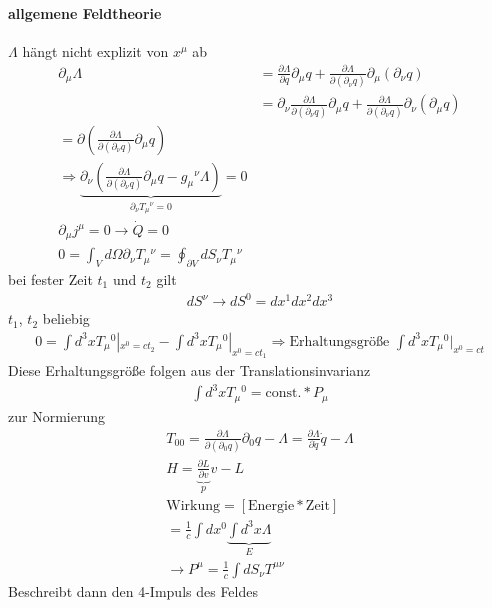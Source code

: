 \documentclass[a4paper]{article}
\begin{document}
\paragraph{allgemene Feldtheorie}
$\Lambda$ hängt nicht explizit von $x^\mu$ ab
\begin{align}
\partial_\mu \Lambda &= \frac{\partial \Lambda}{\partial q}
\partial_\mu\!q+\frac{\partial \Lambda}{\partial(\partial_\nu
q)}\partial_\mu(\partial_\nu q)\\
&=\partial_\nu \frac{\partial \Lambda}{\partial (\partial_\nu q)}
\partial_\mu\!q+\frac{\partial \Lambda}{\partial(\partial_\nu
q)}\partial_\nu(\partial_\mu q)\\
=\partial\left( \frac{\partial \Lambda}{\partial(\partial_\nu q)}\partial_\mu q
\right)\\
\Rightarrow \underbrace{\partial_\nu \left( \frac{\partial
\Lambda}{\partial(\partial_\nu q)}\partial_\mu q - g_\mu{}^\nu \Lambda
\right)}_{\partial_\nu T_\mu{}^\nu=0}=0\\
\partial_\mu j^\mu=0 \rightarrow \dot{Q}=0\\
0=\int_V d\Omega \partial_\nu T_\mu{}^{\nu}=\oint_{\partial V} dS_\nu
T_\mu{}^\nu
\end{align}
bei fester Zeit $t_1$ und $t_2$ gilt 
\begin{align}
dS^\nu \rightarrow dS^0=dx^1dx^2dx^3
\end{align}
$t_1$, $t_2$ beliebig
\begin{align}
0=\int d^3x T_\mu{}^0|_{x^0=ct_2}-\int d^3x T_\mu{}^0|_{x^0=ct_1}
\Rightarrow \text{Erhaltungsgröße } \int d^3x T_\mu{}^0|_{x^0=ct}
\end{align}
Diese Erhaltungsgröße folgen aus der Translationsinvarianz
\begin{align}
\int d^3x T_\mu{}^0=\text{const.}* P_\mu
\end{align}
zur Normierung
\begin{align}
T_{00}=\frac{\partial \Lambda}{\partial(\partial_0 q)}\partial_0 q
-\Lambda=\frac{\partial \Lambda}{\partial \dot{q}}\dot{q}-\Lambda\\
H=\underbrace{\frac{\partial L}{\partial v}}_{p} v-L\\
\text{Wirkung}=\left[ \text{Energie}*\text{Zeit}\right]\\
=\frac{1}{c}\int dx^0\underbrace{\int d^3x\Lambda}_{E}\\
\rightarrow P^\mu=\frac{1}{c}\int dS_\nu T^{\mu\nu}
\end{align}
Beschreibt dann den 4-Impuls des Feldes
\end{document}
